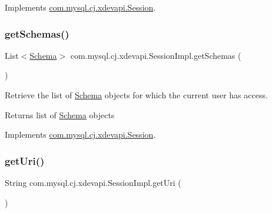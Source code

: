 Implements \mbox{\hyperlink{interfacecom_1_1mysql_1_1cj_1_1xdevapi_1_1_session_a70703d4853bdfee2b32da36a27fa2e52}{com.\+mysql.\+cj.\+xdevapi.\+Session}}.

\mbox{\label{classcom_1_1mysql_1_1cj_1_1xdevapi_1_1_session_impl_a2d607f33ef3231038642b5836b813531}} 
\subsubsection{\texorpdfstring{get\+Schemas()}{getSchemas()}}
{\footnotesize\ttfamily List$<$\mbox{\hyperlink{interfacecom_1_1mysql_1_1cj_1_1xdevapi_1_1_schema}{Schema}}$>$ com.\+mysql.\+cj.\+xdevapi.\+Session\+Impl.\+get\+Schemas (\begin{DoxyParamCaption}{ }\end{DoxyParamCaption})}

Retrieve the list of \mbox{\hyperlink{interfacecom_1_1mysql_1_1cj_1_1xdevapi_1_1_schema}{Schema}} objects for which the current user has access.

\begin{DoxyReturn}{Returns}
list of \mbox{\hyperlink{interfacecom_1_1mysql_1_1cj_1_1xdevapi_1_1_schema}{Schema}} objects 
\end{DoxyReturn}


Implements \mbox{\hyperlink{interfacecom_1_1mysql_1_1cj_1_1xdevapi_1_1_session_ac2c871a98ae18a178d73e76c89655ed3}{com.\+mysql.\+cj.\+xdevapi.\+Session}}.

\mbox{\label{classcom_1_1mysql_1_1cj_1_1xdevapi_1_1_session_impl_af181caf1c47641912a47ef9445a9ddca}} 
\subsubsection{\texorpdfstring{get\+Uri()}{getUri()}}
{\footnotesize\ttfamily String com.\+mysql.\+cj.\+xdevapi.\+Session\+Impl.\+get\+Uri (\begin{DoxyParamCaption}{ }\end{DoxyParamCaption})}

